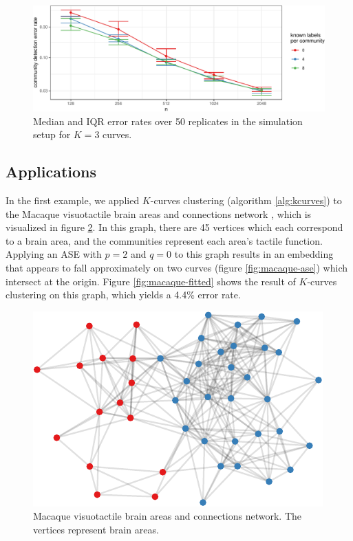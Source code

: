 \documentclass[
  12pt,
]{article}
\theoremstyle{definition}
\theoremstyle{definition}
\theoremstyle{definition}
\theoremstyle{definition}
\theoremstyle{remark}
\begin{document}
\begin{figure}[H]

{\centering \includegraphics{draft_files/figure-latex/sim-curves-3-1} 

}

\caption{Median and IQR error rates over 50 replicates in the simulation setup for $K = 3$ curves.}\label{fig:sim-curves-3}
\end{figure}

\hypertarget{applications-1}{%
\subsection{Applications}\label{applications-1}}

In the first example, we applied \(K\)-curves clustering (algorithm \ref{alg:kcurves}) to the Macaque visuotactile brain areas and connections network \citep{https://doi.org/10.1111/j.1460-9568.2006.04678.x}, which is visualized in figure \ref{fig:macaque-graph}.
In this graph, there are 45 vertices which each correspond to a brain area, and the communities represent each area's tactile function.
Applying an ASE with \(p = 2\) and \(q = 0\) to this graph results in an embedding that appears to fall approximately on two curves (figure \ref{fig:macaque-ase}) which intersect at the origin.
Figure \ref{fig:macaque-fitted} shows the result of \(K\)-curves clustering on this graph,
which yields a 4.4\% error rate.

\begin{figure}[H]

{\centering \includegraphics{draft_files/figure-latex/macaque-graph-1} 

}

\caption{Macaque visuotactile brain areas and connections network. The vertices represent brain areas.}\label{fig:macaque-graph}
\end{figure}
\end{document}
